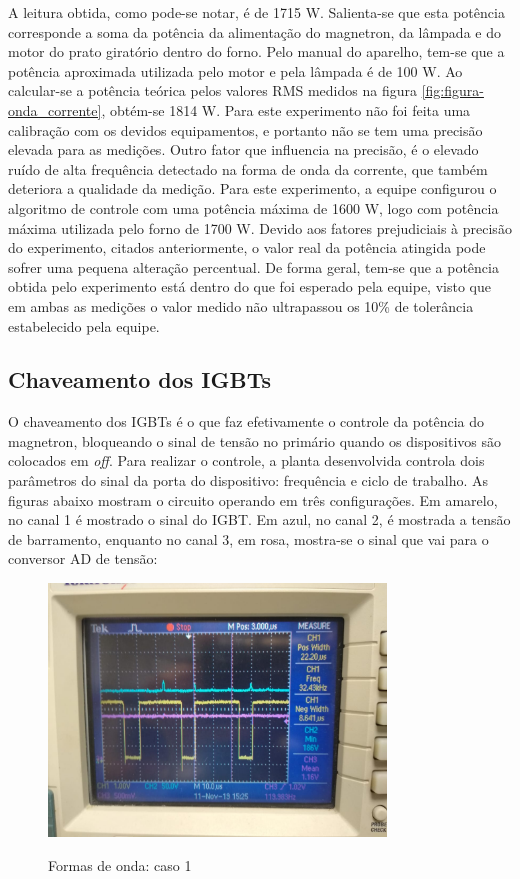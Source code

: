 A leitura obtida, como pode-se notar, é de 1715 W. Salienta-se que esta potência corresponde a soma da potência da alimentação do magnetron, da lâmpada e do motor do prato giratório dentro do forno. Pelo manual do aparelho, tem-se que a potência aproximada utilizada pelo motor e pela lâmpada é de 100 W. Ao calcular-se a potência teórica pelos valores RMS medidos na figura \ref{fig:figura-onda_corrente}, obtém-se 1814 W. Para este experimento não foi feita uma calibração com os devidos equipamentos, e portanto não se tem uma precisão elevada para as medições. Outro fator que influencia na precisão, é o elevado ruído de alta frequência detectado na forma de onda da corrente, que também deteriora a qualidade da medição. Para este experimento, a equipe configurou o algoritmo de controle com uma potência máxima de 1600 W, logo com potência máxima utilizada pelo forno de 1700 W. Devido aos fatores prejudiciais à precisão do experimento, citados anteriormente, o valor real da potência atingida pode sofrer uma pequena alteração percentual. De forma geral, tem-se que a potência obtida pelo experimento está dentro do que foi esperado pela equipe, visto que em ambas as medições o valor medido não ultrapassou os 10\% de tolerância estabelecido pela equipe.

\subsection{Chaveamento dos IGBTs}
O chaveamento dos IGBTs é o que faz efetivamente o controle da potência do magnetron, bloqueando o sinal de tensão no primário quando os dispositivos são colocados em \textit{off}. Para realizar o controle, a planta desenvolvida controla dois parâmetros do sinal da porta do dispositivo: frequência e ciclo de trabalho. As figuras abaixo mostram o circuito operando em três configurações. Em amarelo, no canal 1 é mostrado o sinal do IGBT. Em azul, no canal 2, é mostrada a tensão de barramento, enquanto no canal 3, em rosa, mostra-se o sinal que vai para o conversor AD de tensão:

\begin{figure}[H]
    \centering
    \caption{Formas de onda: caso 1}
    \includegraphics[width=0.8\textwidth]{./dados/figuras/onda_controller_1}
    \label{fig:figura-onda_controller_1}
\end{figure}

